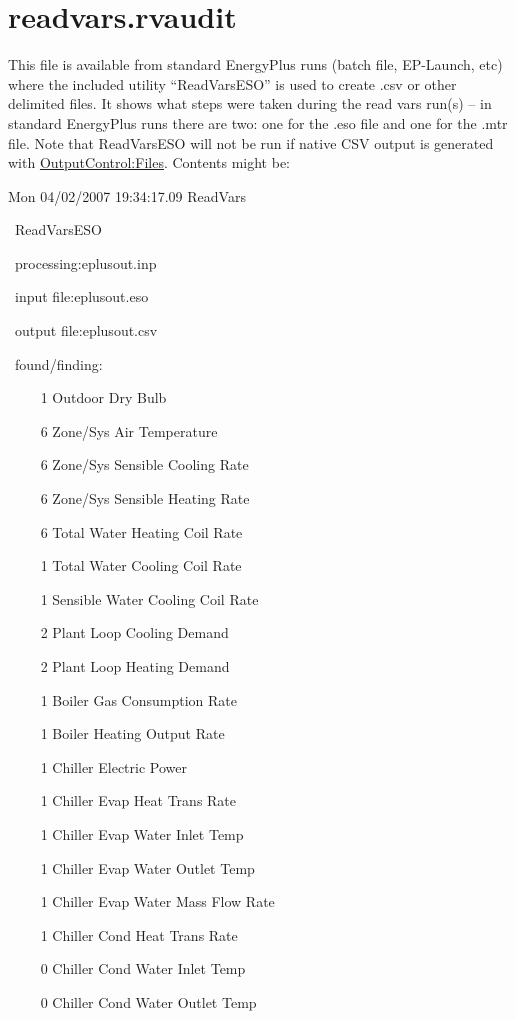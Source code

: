 \section{readvars.rvaudit}\label{readvars.rvaudit}

This file is available from standard EnergyPlus runs (batch file, EP-Launch, etc) where the included utility ``ReadVarsESO'' is used to create .csv or other delimited files. It shows what steps were taken during the read vars run(s) -- in standard EnergyPlus runs there are two: one for the .eso file and one for the .mtr file. Note that ReadVarsESO will not be run if native CSV output is generated with  \hyperref[outputcontrolfiles]{OutputControl:Files}. Contents might be:

Mon 04/02/2007 19:34:17.09 ReadVars

~ReadVarsESO

~processing:eplusout.inp

~input file:eplusout.eso

~output file:eplusout.csv

~found/finding:

~~~~ 1 Outdoor Dry Bulb

~~~~ 6 Zone/Sys Air Temperature

~~~~ 6 Zone/Sys Sensible Cooling Rate

~~~~ 6 Zone/Sys Sensible Heating Rate

~~~~ 6 Total Water Heating Coil Rate

~~~~ 1 Total Water Cooling Coil Rate

~~~~ 1 Sensible Water Cooling Coil Rate

~~~~ 2 Plant Loop Cooling Demand

~~~~ 2 Plant Loop Heating Demand

~~~~ 1 Boiler Gas Consumption Rate

~~~~ 1 Boiler Heating Output Rate

~~~~ 1 Chiller Electric Power

~~~~ 1 Chiller Evap Heat Trans Rate

~~~~ 1 Chiller Evap Water Inlet Temp

~~~~ 1 Chiller Evap Water Outlet Temp

~~~~ 1 Chiller Evap Water Mass Flow Rate

~~~~ 1 Chiller Cond Heat Trans Rate

~~~~ 0 Chiller Cond Water Inlet Temp

~~~~ 0 Chiller Cond Water Outlet Temp

